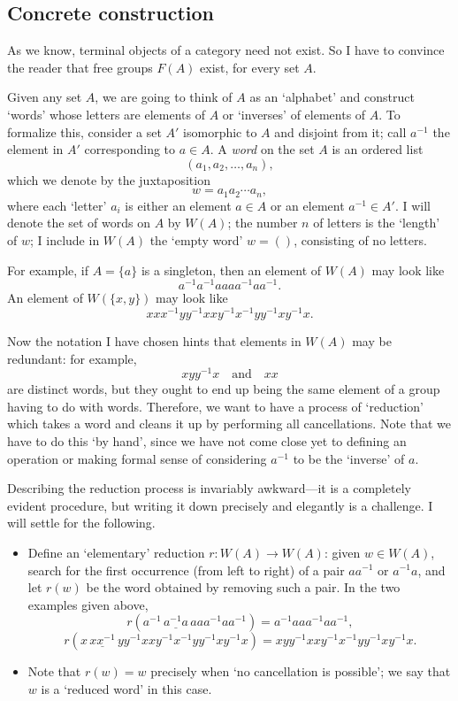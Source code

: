 \subsection{Concrete construction}
\label{subsec:groups:concrete-construction}
As we know, terminal objects of a category need not exist. So I have
to convince the reader that free groups $F(A)$ exist, for every set
$A$.

Given any set $A$, we are going to think of $A$ as an `alphabet' and
construct `words' whose letters are elements of $A$ or `inverses' of
elements of $A$. To formalize this, consider a set $A'$ isomorphic to
$A$ and disjoint from it; call $a^{-1}$ the element in $A'$
corresponding to $a \in A$. A \emph{word} on the set $A$ is an ordered
list
\[
  (a_1, a_2, \dots, a_n),
\]
which we denote by the juxtaposition
\[
  w = a_1 a_2 \cdots a_n,
\]
where each `letter' $a_i$ is either an element $a \in A$ or an element
$a^{-1} \in A'$. I will denote the set of words on $A$ by $W(A)$; the
number $n$ of letters is the `length' of $w$; I include in $W(A)$ the
`empty word' $w = ()$, consisting of no letters.

For example, if $A = \{a\}$ is a singleton, then an element of $W(A)$
may look like
\[
  a^{-1}a^{-1}aaaa^{-1}aa^{-1}.
\]
An element of $W(\{x,y\})$ may look like
\[
  xxx^{-1}yy^{-1}xxy^{-1}x^{-1}yy^{-1}xy^{-1}x.
\]

Now the notation I have chosen hints that elements in $W(A)$ may be
redundant: for example,
\[
  xyy^{-1}x \quad \text{and} \quad xx
\]
are distinct words, but they ought to end up being the same element of
a group having to do with words. Therefore, we want to have a process
of `reduction' which takes a word and cleans it up by performing all
cancellations. Note that we have to do this `by hand', since we have
not come close yet to defining an operation or making formal sense of
considering $a^{-1}$ to be the `inverse' of $a$.

Describing the reduction process is invariably awkward---it is a
completely evident procedure, but writing it down precisely and
elegantly is a challenge. I will settle for the following.
\begin{itemize}
\item Define an `elementary' reduction $r : W(A) \to W(A)$: given
  $w \in W(A)$, search for the first occurrence (from left to right)
  of a pair $aa^{-1}$ or $a^{-1}a$, and let $r(w)$ be the word
  obtained by removing such a pair. In the two examples given above,
  \[
    r(a^{-1}\,\underline{a^{-1}a}\,aaa^{-1}aa^{-1}) =
    a^{-1}aaa^{-1}aa^{-1},
  \]
  \[
    r(x\,\underline{xx^{-1}}\,yy^{-1}xxy^{-1}x^{-1}yy^{-1}xy^{-1}x) =
    xyy^{-1}xxy^{-1}x^{-1}yy^{-1}xy^{-1}x.
  \]
\item Note that $r(w) = w$ precisely when `no cancellation is
  possible'; we say that $w$ is a `reduced word' in this case.
\end{itemize}

